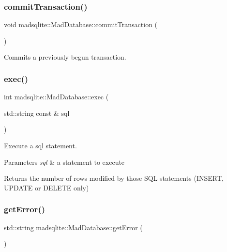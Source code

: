 \subsubsection{\texorpdfstring{commit\+Transaction()}{commitTransaction()}}
{\footnotesize\ttfamily void madsqlite\+::\+Mad\+Database\+::commit\+Transaction (\begin{DoxyParamCaption}{ }\end{DoxyParamCaption})}

Commits a previously begun transaction. \hypertarget{classmadsqlite_1_1_mad_database_adba4c69666317dcdf14cd3a1eb6260dd}{}\label{classmadsqlite_1_1_mad_database_adba4c69666317dcdf14cd3a1eb6260dd} 
\subsubsection{\texorpdfstring{exec()}{exec()}}
{\footnotesize\ttfamily int madsqlite\+::\+Mad\+Database\+::exec (\begin{DoxyParamCaption}\item[{std\+::string const \&}]{sql }\end{DoxyParamCaption})}

Execute a sql statement.


\begin{DoxyParams}{Parameters}
{\em sql} & a statement to execute \\
\hline
\end{DoxyParams}
\begin{DoxyReturn}{Returns}
the number of rows modified by those S\+QL statements (I\+N\+S\+E\+RT, U\+P\+D\+A\+TE or D\+E\+L\+E\+TE only) 
\end{DoxyReturn}
\hypertarget{classmadsqlite_1_1_mad_database_ad70e43249370cd4a04183f3f98751b4e}{}\label{classmadsqlite_1_1_mad_database_ad70e43249370cd4a04183f3f98751b4e} 
\subsubsection{\texorpdfstring{get\+Error()}{getError()}}
{\footnotesize\ttfamily std\+::string madsqlite\+::\+Mad\+Database\+::get\+Error (\begin{DoxyParamCaption}{ }\end{DoxyParamCaption})}

